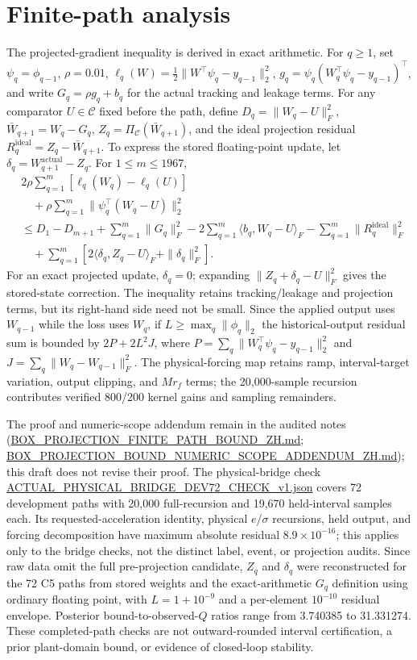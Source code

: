 \documentclass[11pt]{article}
\newcommand{\Cset}{\mathcal{C}}
\begin{document}
\section{Finite-path analysis}
The projected-gradient inequality is derived in exact arithmetic. For $q\geq1$, set $\psi_q=\phi_{q-1}$, $\rho=0.01$, $\ell_q(W)=\tfrac12\|W^\top\psi_q-y_{q-1}\|_2^2$, $g_q=\psi_q(W_q^\top\psi_q-y_{q-1})^\top$, and write $G_q=\rho g_q+b_q$ for the actual tracking and leakage terms. For any comparator $U\in\Cset$ fixed before the path, define $D_q=\|W_q-U\|_F^2$, $\bar W_{q+1}=W_q-G_q$, $Z_q=\Pi_{\Cset}(\bar W_{q+1})$, and the ideal projection residual $R_q^{\mathrm{ideal}}=Z_q-\bar W_{q+1}$. To express the stored floating-point update, let $\delta_q=W_{q+1}^{\mathrm{actual}}-Z_q$. For $1\leq m\leq1967$,
\begin{equation}
\begin{aligned}
&2\rho\sum_{q=1}^{m}\!\left[\ell_q(W_q)-\ell_q(U)\right] \\
&\quad+\rho\sum_{q=1}^{m}\!\|\psi_q^\top(W_q-U)\|_2^2 \\
&\leq D_1-D_{m+1}+\sum_{q=1}^{m}\|G_q\|_F^2
-2\sum_{q=1}^{m}\langle b_q,W_q-U\rangle_F
-\sum_{q=1}^{m}\|R_q^{\mathrm{ideal}}\|_F^2 \\
&\quad+\sum_{q=1}^{m}\left[2\langle\delta_q,Z_q-U\rangle_F+\|\delta_q\|_F^2\right].
\end{aligned}
\label{eq:path-inequality}
\end{equation}
For an exact projected update, $\delta_q=0$; expanding $\|Z_q+\delta_q-U\|_F^2$ gives the stored-state correction. The inequality retains tracking/leakage and projection terms, but its right-hand side need not be small. Since the applied output uses $W_{q-1}$ while the loss uses $W_q$, if $L\geq\max_q\|\phi_q\|_2$ the historical-output residual sum is bounded by $2P+2L^2J$, where $P=\sum_q\|W_q^\top\psi_q-y_{q-1}\|_2^2$ and $J=\sum_q\|W_q-W_{q-1}\|_F^2$. The physical-forcing map retains ramp, interval-target variation, output clipping, and $Mr_f$ terms; the 20,000-sample recursion contributes verified 800/200 kernel gains and sampling remainders.

The proof and numeric-scope addendum remain in the audited notes (\url{BOX_PROJECTION_FINITE_PATH_BOUND_ZH.md}; \url{BOX_PROJECTION_BOUND_NUMERIC_SCOPE_ADDENDUM_ZH.md}); this draft does not revise their proof. The physical-bridge check \url{ACTUAL_PHYSICAL_BRIDGE_DEV72_CHECK_v1.json} covers 72 development paths with 20,000 full-recursion and 19,670 held-interval samples each. Its requested-acceleration identity, physical $e$/$\sigma$ recursions, held output, and forcing decomposition have maximum absolute residual $8.9\times10^{-16}$; this applies only to the bridge checks, not the distinct label, event, or projection audits. Since raw data omit the full pre-projection candidate, $Z_q$ and $\delta_q$ were reconstructed for the 72 C5 paths from stored weights and the exact-arithmetic $G_q$ definition using ordinary floating point, with $L=1+10^{-9}$ and a per-element $10^{-10}$ residual envelope. Posterior bound-to-observed-$Q$ ratios range from 3.740385 to 31.331274. These completed-path checks are not outward-rounded interval certification, a prior plant-domain bound, or evidence of closed-loop stability.
\end{document}
